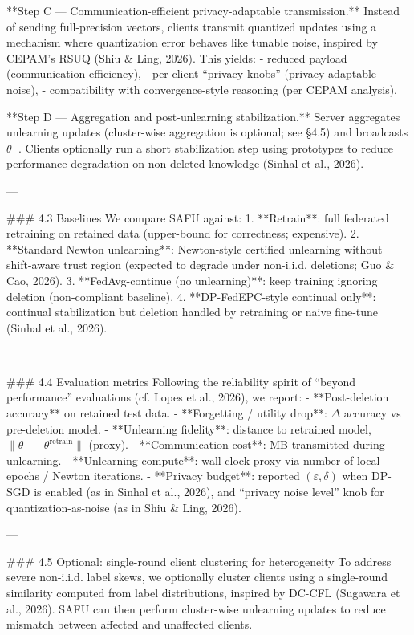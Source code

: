 **Step C — Communication-efficient privacy-adaptable transmission.**  
Instead of sending full-precision vectors, clients transmit quantized updates using a mechanism where quantization error behaves like tunable noise, inspired by CEPAM’s RSUQ (Shiu & Ling, 2026). This yields:
- reduced payload (communication efficiency),
- per-client “privacy knobs” (privacy-adaptable noise),
- compatibility with convergence-style reasoning (per CEPAM analysis).

**Step D — Aggregation and post-unlearning stabilization.**  
Server aggregates unlearning updates (cluster-wise aggregation is optional; see §4.5) and broadcasts \(\theta^{-}\). Clients optionally run a short stabilization step using prototypes to reduce performance degradation on non-deleted knowledge (Sinhal et al., 2026).

---

### 4.3 Baselines
We compare SAFU against:
1. **Retrain**: full federated retraining on retained data (upper-bound for correctness; expensive).
2. **Standard Newton unlearning**: Newton-style certified unlearning without shift-aware trust region (expected to degrade under non-i.i.d. deletions; Guo & Cao, 2026).
3. **FedAvg-continue (no unlearning)**: keep training ignoring deletion (non-compliant baseline).
4. **DP-FedEPC-style continual only**: continual stabilization but deletion handled by retraining or naive fine-tune (Sinhal et al., 2026).

---

### 4.4 Evaluation metrics
Following the reliability spirit of “beyond performance” evaluations (cf. Lopes et al., 2026), we report:
- **Post-deletion accuracy** on retained test data.
- **Forgetting / utility drop**: \(\Delta\) accuracy vs pre-deletion model.
- **Unlearning fidelity**: distance to retrained model, \(\|\theta^{-}-\theta^{\text{retrain}}\|\) (proxy).
- **Communication cost**: MB transmitted during unlearning.
- **Unlearning compute**: wall-clock proxy via number of local epochs / Newton iterations.
- **Privacy budget**: reported \((\varepsilon,\delta)\) when DP-SGD is enabled (as in Sinhal et al., 2026), and “privacy noise level” knob for quantization-as-noise (as in Shiu & Ling, 2026).

---

### 4.5 Optional: single-round client clustering for heterogeneity
To address severe non-i.i.d. label skews, we optionally cluster clients using a single-round similarity computed from label distributions, inspired by DC-CFL (Sugawara et al., 2026). SAFU can then perform cluster-wise unlearning updates to reduce mismatch between affected and unaffected clients.

